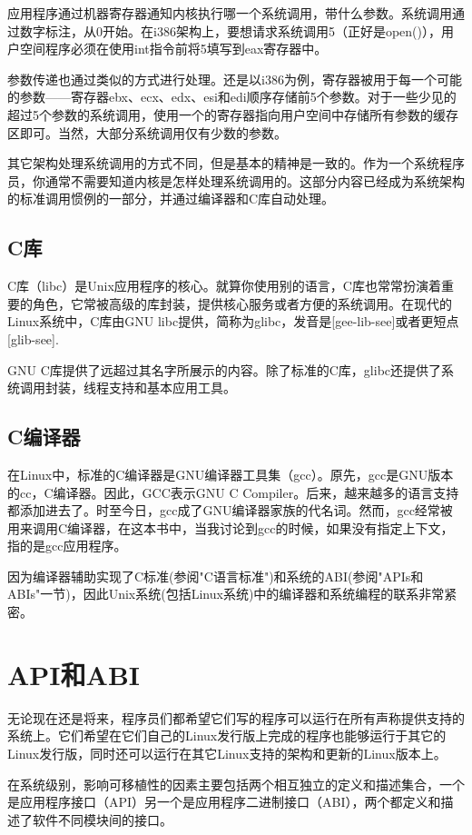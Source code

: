 应用程序通过机器寄存器通知内核执行哪一个系统调用，带什么参数。系统调用通过数字标注，从0开始。在i386架构上，要想请求系统调用5（正好是open()），用户空间程序必须在使用int指令前将5填写到eax寄存器中。

参数传递也通过类似的方式进行处理。还是以i386为例，寄存器被用于每一个可能的参数——寄存器ebx、ecx、edx、esi和edi顺序存储前5个参数。对于一些少见的超过5个参数的系统调用，使用一个的寄存器指向用户空间中存储所有参数的缓存区即可。当然，大部分系统调用仅有少数的参数。

其它架构处理系统调用的方式不同，但是基本的精神是一致的。作为一个系统程序员，你通常不需要知道内核是怎样处理系统调用的。这部分内容已经成为系统架构的标准调用惯例的一部分，并通过编译器和C库自动处理。 

\subsection{C库}

C库（libc）是Unix应用程序的核心。就算你使用别的语言，C库也常常扮演着重要的角色，它常被高级的库封装，提供核心服务或者方便的系统调用。在现代的Linux系统中，C库由GNU libc提供，简称为glibc，发音是[gee-lib-see]或者更短点[glib-see].

GNU C库提供了远超过其名字所展示的内容。除了标准的C库，glibc还提供了系统调用封装，线程支持和基本应用工具。 

\subsection{C编译器}
在Linux中，标准的C编译器是GNU编译器工具集（gcc）。原先，gcc是GNU版本的cc，C编译器。因此，GCC表示GNU C Compiler。后来，越来越多的语言支持都添加进去了。时至今日，gcc成了GNU编译器家族的代名词。然而，gcc经常被用来调用C编译器，在这本书中，当我讨论到gcc的时候，如果没有指定上下文，指的是gcc应用程序。


因为编译器辅助实现了C标准(参阅"C语言标准")和系统的ABI(参阅"APIs和ABIs"一节)，因此Unix系统(包括Linux系统)中的编译器和系统编程的联系非常紧密。 

\section{API和ABI}
无论现在还是将来，程序员们都希望它们写的程序可以运行在所有声称提供支持的系统上。它们希望在它们自己的Linux发行版上完成的程序也能够运行于其它的Linux发行版，同时还可以运行在其它Linux支持的架构和更新的Linux版本上。

在系统级别，影响可移植性的因素主要包括两个相互独立的定义和描述集合，一个是应用程序接口（API）另一个是应用程序二进制接口（ABI），两个都定义和描述了软件不同模块间的接口。 

